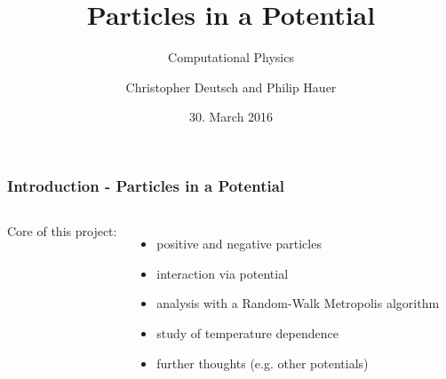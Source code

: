 \documentclass[mathserif,serif]{beamer}
\author{Christopher Deutsch and Philip Hauer}
\title{Particles in a Potential}
\date{30. March 2016}
\subtitle{{\small Computational Physics}}
\begin{document}
\frame[plain]{\titlepage}
\setcounter{framenumber}{0}
\begin{frame}
	\frametitle{Introduction - Particles in a Potential}
		\begin{columns}
			Core of this project:
			\begin{itemize}
				\item positive and negative particles
				\item interaction via potential
				\item analysis with a Random-Walk Metropolis algorithm
				\item study of temperature dependence
				\item further thoughts (e.g. other potentials)
			\end{itemize}
			
	\end{columns}
\end{frame}





\end{document}
